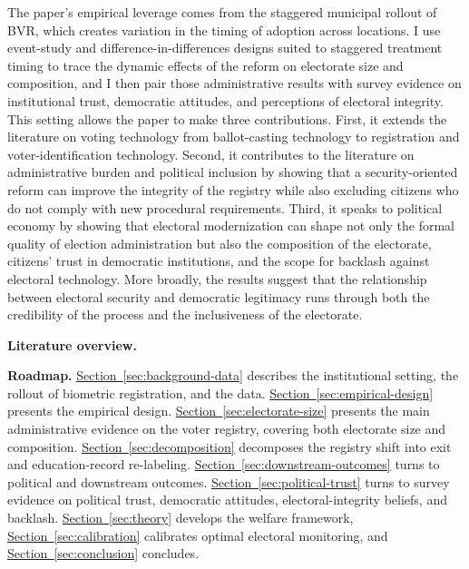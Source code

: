 The paper's empirical leverage comes from the staggered municipal rollout of BVR, which creates variation in the timing of adoption across locations. I use event-study and difference-in-differences designs suited to staggered treatment timing to trace the dynamic effects of the reform on electorate size and composition, and I then pair those administrative results with survey evidence on institutional trust, democratic attitudes, and perceptions of electoral integrity. This setting allows the paper to make three contributions. First, it extends the literature on voting technology from ballot-casting technology to registration and voter-identification technology. Second, it contributes to the literature on administrative burden and political inclusion by showing that a security-oriented reform can improve the integrity of the registry while also excluding citizens who do not comply with new procedural requirements. Third, it speaks to political economy by showing that electoral modernization can shape not only the formal quality of election administration but also the composition of the electorate, citizens' trust in democratic institutions, and the scope for backlash against electoral technology. More broadly, the results suggest that the relationship between electoral security and democratic legitimacy runs through both the credibility of the process and the inclusiveness of the electorate.

\textbf{Literature overview.} 

\textbf{Roadmap.} \hyperref[sec:background-data]{Section~\ref*{sec:background-data}} describes the institutional setting, the rollout of biometric registration, and the data. \hyperref[sec:empirical-design]{Section~\ref*{sec:empirical-design}} presents the empirical design. \hyperref[sec:electorate-size]{Section~\ref*{sec:electorate-size}} presents the main administrative evidence on the voter registry, covering both electorate size and composition. \hyperref[sec:decomposition]{Section~\ref*{sec:decomposition}} decomposes the registry shift into exit and education-record re-labeling. \hyperref[sec:downstream-outcomes]{Section~\ref*{sec:downstream-outcomes}} turns to political and downstream outcomes. \hyperref[sec:political-trust]{Section~\ref*{sec:political-trust}} turns to survey evidence on political trust, democratic attitudes, electoral-integrity beliefs, and backlash. \hyperref[sec:theory]{Section~\ref*{sec:theory}} develops the welfare framework, \hyperref[sec:calibration]{Section~\ref*{sec:calibration}} calibrates optimal electoral monitoring, and \hyperref[sec:conclusion]{Section~\ref*{sec:conclusion}} concludes.

